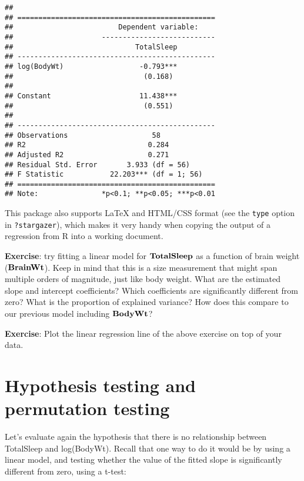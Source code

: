 \documentclass[
]{book}
\begin{document}
\begin{verbatim}
## 
## ===============================================
##                         Dependent variable:    
##                     ---------------------------
##                             TotalSleep         
## -----------------------------------------------
## log(BodyWt)                  -0.793***         
##                               (0.168)          
##                                                
## Constant                     11.438***         
##                               (0.551)          
##                                                
## -----------------------------------------------
## Observations                    58             
## R2                             0.284           
## Adjusted R2                    0.271           
## Residual Std. Error       3.933 (df = 56)      
## F Statistic           22.203*** (df = 1; 56)   
## ===============================================
## Note:               *p<0.1; **p<0.05; ***p<0.01
\end{verbatim}

This package also supports LaTeX and HTML/CSS format (see the \texttt{type} option in \texttt{?stargazer}), which makes it very handy when copying the output of a regression from R into a working document.

\textbf{Exercise}: try fitting a linear model for \(\bf{TotalSleep}\) as a function of brain weight (\(\bf{BrainWt}\)). Keep in mind that this is a size measurement that might span multiple orders of magnitude, just like body weight. What are the estimated slope and intercept coefficients? Which coefficients are significantly different from zero? What is the proportion of explained variance? How does this compare to our previous model including \(\bf{BodyWt}\)?

\textbf{Exercise}: Plot the linear regression line of the above exercise on top of your data.

\hypertarget{hypothesis-testing-and-permutation-testing}{%
\section{Hypothesis testing and permutation testing}\label{hypothesis-testing-and-permutation-testing}}

Let's evaluate again the hypothesis that there is no relationship between TotalSleep and log(BodyWt). Recall that one way to do it would be by using a linear model, and testing whether the value of the fitted slope is significantly different from zero, using a t-test:
\end{document}

